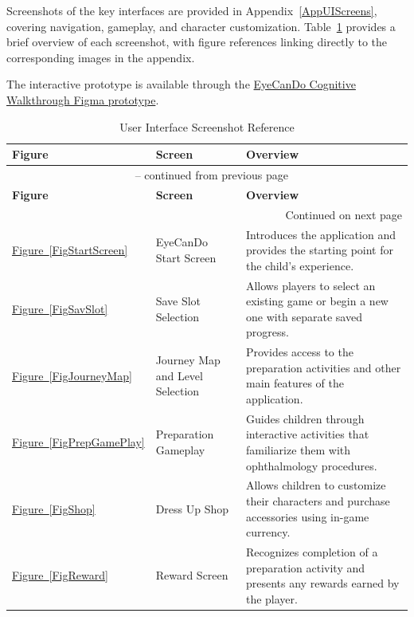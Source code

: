 \documentclass[10pt, titlepage]{article}
\begin{document}
Screenshots of the key interfaces are provided in
Appendix~\ref{AppUIScreens}, covering navigation, gameplay,
and character customization.
Table~\ref{TblUIScreens} provides a brief overview of
each screenshot, with figure references linking directly
to the corresponding images in the appendix.

The interactive prototype is available through the
\href{https://www.figma.com/design/IBdPBjcaoQjUY02BwWSvpv/EyeCanDo-Cognitive-Walkthrough?node-id=0-1}
{EyeCanDo Cognitive Walkthrough Figma prototype}.



\begin{longtable}{@{}p{}p{}p{}@{}}
\caption{User Interface Screenshot Reference}\label{TblUIScreens}\\
\toprule
\textbf{Figure} & \textbf{Screen} & \textbf{Overview}\\
\midrule
\endfirsthead
\multicolumn{3}{c}{\tablename\ \thetable{} -- continued from previous page}\\
\toprule
\textbf{Figure} & \textbf{Screen} & \textbf{Overview}\\
\midrule
\endhead
\midrule
\multicolumn{3}{r}{Continued on next page}\\
\endfoot
\bottomrule
\endlastfoot

\hyperref[FigStartScreen]{Figure~\ref*{FigStartScreen}} &
EyeCanDo Start Screen &
Introduces the application and provides the starting point
for the child's experience.\\

\hyperref[FigSavSlot]{Figure~\ref*{FigSavSlot}} &
Save Slot Selection &
Allows players to select an existing game or begin a
new one with separate saved progress.\\

\hyperref[FigJourneyMap]{Figure~\ref*{FigJourneyMap}} &
Journey Map and Level Selection &
Provides access to the preparation activities and other
main features of the application.\\

\hyperref[FigPrepGamePlay]{Figure~\ref*{FigPrepGamePlay}} &
Preparation Gameplay &
Guides children through interactive activities that
familiarize them with ophthalmology procedures.\\

\hyperref[FigShop]{Figure~\ref*{FigShop}} &
Dress Up Shop &
Allows children to customize their characters and
purchase accessories using in-game currency.\\

\hyperref[FigReward]{Figure~\ref*{FigReward}} &
Reward Screen &
Recognizes completion of a preparation activity and
presents any rewards earned by the player.\\

\end{longtable}
\end{document}
